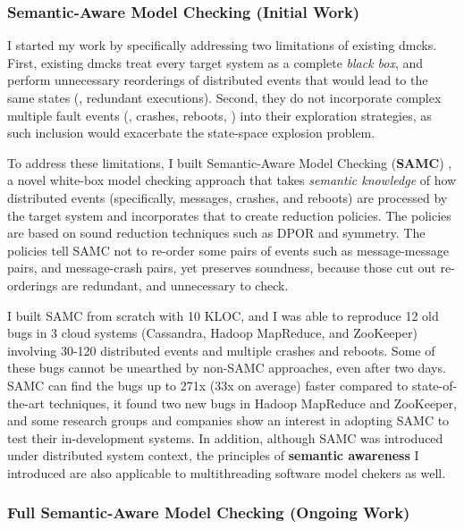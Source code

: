\documentclass[10pt]{article}
\begin{document}
\subsubsection*{Semantic-Aware Model Checking (Initial Work)} 

I started my work by specifically addressing two limitations of existing dmcks.
First, existing dmcks treat every target system as a complete \textit{black
box}, and perform unnecessary reorderings of distributed events that would lead
to the same states (\ie, redundant executions). Second, they do not incorporate
complex multiple fault events (\eg, crashes, reboots, \etc) into their exploration
strategies, as such inclusion would exacerbate the state-space explosion
problem.

To address these limitations, I built Semantic-Aware Model Checking
(\textbf{SAMC}) \cite{Leesatapornwongsa+15-SamcIssta,Leesatapornwongsa+14-Samc},
a novel white-box model checking approach that takes \textit{semantic knowledge}
of how distributed events (specifically, messages, crashes, and reboots) are
processed by the target system and incorporates that to create reduction
policies. The policies are based on sound reduction techniques such as DPOR and
symmetry. The policies tell SAMC not to re-order some pairs of events such as
message-message pairs, and message-crash pairs, yet preserves soundness, because
those cut out re-orderings are redundant, and unnecessary to check.

I built SAMC from scratch with 10 KLOC, and I was able to reproduce 12 old bugs
in 3 cloud systems (Cassandra, Hadoop MapReduce, and ZooKeeper) involving
30-120 distributed events and multiple crashes and reboots. Some of these bugs
cannot be unearthed by non-SAMC approaches, even after two days. SAMC can find
the bugs up to 271x (33x on average) faster compared to state-of-the-art
techniques, it found two new bugs in Hadoop MapReduce and ZooKeeper, and some
research groups and companies show an interest in adopting SAMC to test their
in-development systems. In addition, although SAMC was introduced under
distributed system context, the principles of \textbf{semantic awareness} I
introduced are also applicable to multithreading software model chekers as
well.

\subsubsection*{Full Semantic-Aware Model Checking (Ongoing Work)} 
\end{document}
